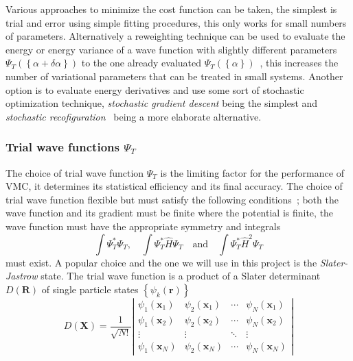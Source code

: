 \documentclass[final,3p,times,twocolumn]{elsarticle}
\begin{document}
	Various approaches to minimize the cost function can be taken, the simplest is trial and error using simple fitting procedures, this only works for small numbers of parameters. Alternatively a reweighting technique can be used to evaluate the energy or energy variance of a wave function with slightly different parameters $\Psi_{T}(\left\{\alpha + \delta \alpha\right\})$ to the one already evaluated $\Psi_{T}(\left\{\alpha\right\})$~\cite{umrigar1988optimized}, this increases the number of variational parameters that can be treated in small systems. Another option is to evaluate energy derivatives and use some sort of stochastic optimization technique, \emph{stochastic gradient descent} being the simplest and \emph{stochastic recofiguration}~\cite{sorella1998green} being a more elaborate alternative. 
		
	\subsubsection{Trial wave functions $\Psi_{T}$}
	The choice of trial wave function $\Psi_{T}$ is the limiting factor for the performance of VMC, it determines its statistical efficiency and its final accuracy. The choice of trial wave function flexible but must satisfy the following conditions~\cite{foulkes2001quantum}; both the wave function and its gradient must be finite where the potential is finite, the wave function must have the appropriate symmetry and integrals 
	\begin{equation}
		\int \Psi_{T}^{*} \Psi_{T}, \quad \int \Psi_{T}^{*} \hat{H} \Psi_{T} \quad \text{and} \quad \int \Psi_{T}^{*} \hat{H}^{2} \Psi_{T}
	\end{equation}
	must exist. A popular choice and the one we will use in this project is the \emph{Slater-Jastrow} state. The trial wave function is a product of a Slater determinant $D(\mathbf{R})$ of single particle states $\left\{\psi_k(\mathbf{r})\right\}$ 
	\begin{equation}
		D(\mathbf{X}) = \frac{1}{\sqrt{N !}}\left|\begin{array}{cccc}\psi_{1}\left(\mathbf{x}_{1}\right) & \psi_{2}\left(\mathbf{x}_{1}\right) & \cdots & \psi_{N}\left(\mathbf{x}_{1}\right) \\ \psi_{1}\left(\mathbf{x}_{2}\right) & \psi_{2}\left(\mathbf{x}_{2}\right) & \cdots & \psi_{N}\left(\mathbf{x}_{2}\right) \\ \vdots & \vdots & \ddots & \vdots \\ \psi_{1}\left(\mathbf{x}_{N}\right) & \psi_{2}\left(\mathbf{x}_{N}\right) & \cdots & \psi_{N}\left(\mathbf{x}_{N}\right)\end{array}\right|
	\end{equation}	
\end{document}
